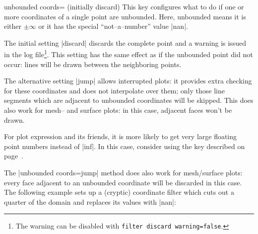 \begin{pgfplotskey}{unbounded coords= (initially discard)}
	This key configures what to do if one or more coordinates of a single point are unbounded. Here, unbounded means it is either $\pm \infty$ or it has the special ``not--a--number'' value |nan|.

	The initial setting |discard| discards the complete point and a warning is issued in the log file\footnote{The warning can be disabled with \texttt{filter discard warning=false}.}. This setting has the same effect as if the unbounded point did not occur: lines will be drawn between the neighboring points.

	The alternative setting |jump| allows interrupted plots: it provides extra checking for these coordinates and does not interpolate over them; only those line segments which are adjacent to unbounded coordinates will be skipped. This does also work for mesh-- and surface plots: in this case, adjacent faces won't be drawn.
\begin{codeexample}[]
\end{codeexample}

	For plot expression and its friends, it is more likely to get very large floating point numbers instead of |inf|. In this case, consider using the  key described on page~\pageref{key:restrict:x:to:domain}.

	The |unbounded coords=jump| method does also work for mesh/surface plots: every face adjacent to an unbounded coordinate will be discarded in this case. The following example sets up a (cryptic) coordinate filter which cuts out a quarter of the domain and replaces its values with |nan|:
\begin{codeexample}[]
\end{codeexample}
\end{pgfplotskey}


